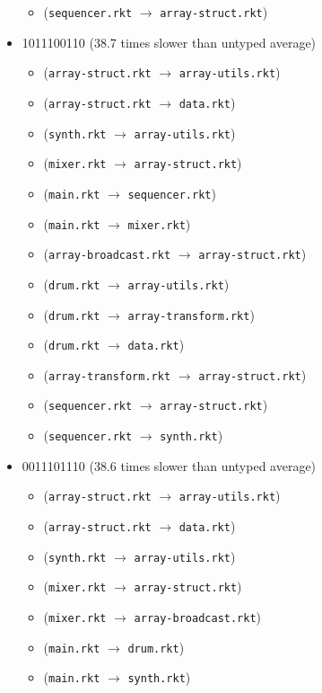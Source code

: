 \documentclass{article}
\newcommand{\mono}[1]{\texttt{#1}}
\begin{document}
\begin{itemize}
\begin{itemize}
  \item (\mono{sequencer.rkt} $\rightarrow$ \mono{array-struct.rkt})
  \end{itemize}
\item 1011100110 (38.7 times slower than untyped average)
  \begin{itemize}
  \item (\mono{array-struct.rkt} $\rightarrow$ \mono{array-utils.rkt})
  \item (\mono{array-struct.rkt} $\rightarrow$ \mono{data.rkt})
  \item (\mono{synth.rkt} $\rightarrow$ \mono{array-utils.rkt})
  \item (\mono{mixer.rkt} $\rightarrow$ \mono{array-struct.rkt})
  \item (\mono{main.rkt} $\rightarrow$ \mono{sequencer.rkt})
  \item (\mono{main.rkt} $\rightarrow$ \mono{mixer.rkt})
  \item (\mono{array-broadcast.rkt} $\rightarrow$ \mono{array-struct.rkt})
  \item (\mono{drum.rkt} $\rightarrow$ \mono{array-utils.rkt})
  \item (\mono{drum.rkt} $\rightarrow$ \mono{array-transform.rkt})
  \item (\mono{drum.rkt} $\rightarrow$ \mono{data.rkt})
  \item (\mono{array-transform.rkt} $\rightarrow$ \mono{array-struct.rkt})
  \item (\mono{sequencer.rkt} $\rightarrow$ \mono{array-struct.rkt})
  \item (\mono{sequencer.rkt} $\rightarrow$ \mono{synth.rkt})
  \end{itemize}
\item 0011101110 (38.6 times slower than untyped average)
  \begin{itemize}
  \item (\mono{array-struct.rkt} $\rightarrow$ \mono{array-utils.rkt})
  \item (\mono{array-struct.rkt} $\rightarrow$ \mono{data.rkt})
  \item (\mono{synth.rkt} $\rightarrow$ \mono{array-utils.rkt})
  \item (\mono{mixer.rkt} $\rightarrow$ \mono{array-struct.rkt})
  \item (\mono{mixer.rkt} $\rightarrow$ \mono{array-broadcast.rkt})
  \item (\mono{main.rkt} $\rightarrow$ \mono{drum.rkt})
  \item (\mono{main.rkt} $\rightarrow$ \mono{synth.rkt})

\end{itemize}
\end{itemize}
\end{document}
